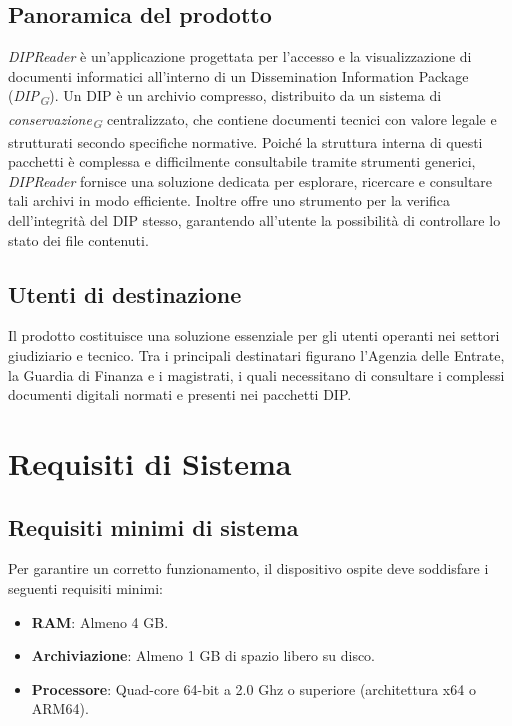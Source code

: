 \documentclass[a4paper,12pt]{article}
\newcommand{\glossario}[1]{\textit{#1}\textsubscript{\textbf{\textit{\textcolor{gray}{G}}}}}
\begin{document}
\subsection{Panoramica del prodotto}
\textit{DIPReader} è un'applicazione progettata per l'accesso e la visualizzazione di documenti informatici all'interno di un Dissemination Information Package (\glossario{DIP}). Un DIP è un archivio compresso, distribuito da un sistema di \glossario{conservazione} centralizzato, che contiene documenti tecnici con valore legale e strutturati secondo specifiche normative. 
Poiché la struttura interna di questi pacchetti è complessa e difficilmente consultabile tramite strumenti generici, \textit{DIPReader} fornisce una soluzione dedicata per esplorare, ricercare e consultare tali archivi in modo efficiente. Inoltre offre uno strumento per la verifica dell'integrità del DIP stesso, garantendo all'utente la possibilità di controllare lo stato dei file contenuti.

\subsection{Utenti di destinazione}
Il prodotto costituisce una soluzione essenziale per gli utenti operanti nei settori giudiziario e tecnico. Tra i principali destinatari figurano l'Agenzia delle Entrate, la Guardia di Finanza e i magistrati, i quali necessitano di consultare i complessi documenti digitali normati e presenti nei pacchetti DIP.

\newpage

\section{Requisiti di Sistema} \label{requisiti}

\subsection{Requisiti minimi di sistema}
Per garantire un corretto funzionamento, il dispositivo ospite deve soddisfare i seguenti requisiti minimi:
\begin{itemize}
    \item \textbf{RAM}: Almeno 4 GB.
    \item \textbf{Archiviazione}: Almeno 1 GB di spazio libero su disco.
    \item \textbf{Processore}: Quad-core 64-bit a 2.0 Ghz o superiore (architettura x64 o ARM64).
\end{itemize}
\end{document}
